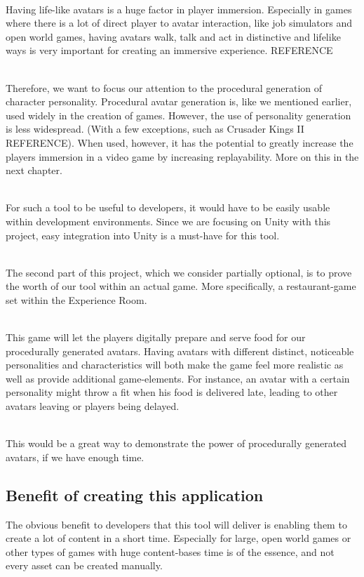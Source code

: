 \documentclass[11pt]{article}
\begin{document}
~\\
Having life-like avatars is a huge factor in player immersion. Especially in games where there is a lot of direct player to avatar interaction, like job simulators and open world games, having avatars walk, talk and act in distinctive and lifelike ways is very important for creating an immersive experience. 
REFERENCE

~\\
Therefore, we want to focus our attention to the procedural generation of character personality. Procedural avatar generation is, like we mentioned earlier, used widely in the creation of games. However, the use of personality generation is less widespread. (With a few exceptions, such as Crusader Kings II REFERENCE). When used, however, it has the potential to greatly increase the players immersion in a video game by increasing replayability. More on this in the next chapter.

~\\
For such a tool to be useful to developers, it would have to be easily usable within development environments. Since we are focusing on Unity with this project, easy integration into Unity is a must-have for this tool.

~\\
The second part of this project, which we consider partially optional, is to prove the worth of our tool within an actual game. More specifically, a restaurant-game set within the Experience Room.

~\\
This game will let the players digitally prepare and serve food for our procedurally generated avatars. Having avatars with different distinct, noticeable personalities and characteristics will both make the game feel more realistic as well as provide additional game-elements. For instance, an avatar with a certain personality might throw a fit when his food is delivered late, leading to other avatars leaving or players being delayed.

~\\
This would be a great way to demonstrate the power of procedurally generated avatars, if we have enough time.

\newpage
{}
{}
\subsection*{Benefit of creating this application}
The obvious benefit to developers that this tool will deliver is enabling them to create a lot of content in a short time. Especially for large, open world games or other types of games with huge content-bases time is of the essence, and not every asset can be created manually.
\end{document}
